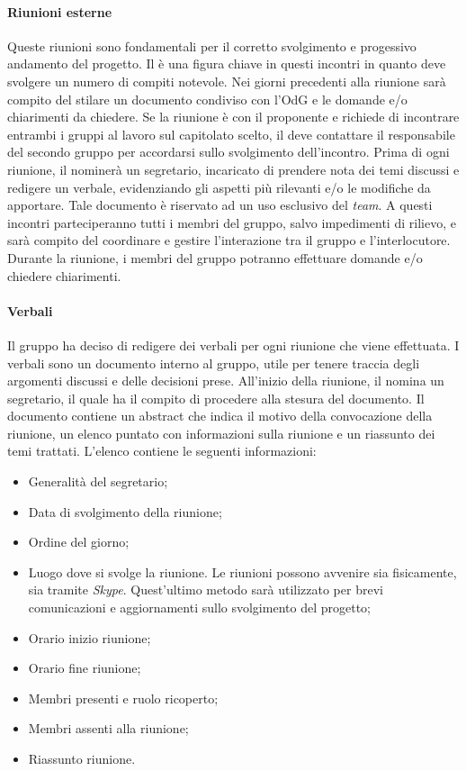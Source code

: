 			\paragraph{Riunioni esterne}
			Queste riunioni sono fondamentali per il corretto svolgimento e progessivo andamento del progetto.
			Il \textit{\RdP} è una figura chiave in questi incontri in quanto deve svolgere un numero di compiti notevole.
			Nei giorni precedenti alla riunione sarà compito del \textit{\RdP} stilare un documento condiviso con l'OdG e le domande e/o chiarimenti da chiedere. Se la riunione è con il proponente e richiede di incontrare entrambi i gruppi al lavoro sul capitolato scelto, il \textit{\RdP} deve contattare il responsabile del secondo gruppo per accordarsi sullo svolgimento dell'incontro. Prima di ogni riunione, il \textit{\RdP} nominerà un segretario, incaricato di prendere nota dei temi discussi e redigere un verbale, evidenziando gli aspetti più rilevanti e/o le modifiche da apportare. Tale documento è riservato ad un uso esclusivo del \textit{team}.
			A questi incontri parteciperanno tutti i membri del gruppo, salvo impedimenti di rilievo, e sarà compito del \textit{\RdP} coordinare e gestire l'interazione tra il gruppo e l'interlocutore. Durante la riunione, i membri del gruppo potranno effettuare domande e/o chiedere chiarimenti. 
			
			\paragraph{Verbali}
			Il gruppo ha deciso di redigere dei verbali per ogni riunione che viene effettuata. I verbali sono un documento interno al gruppo, utile per tenere traccia degli argomenti discussi e delle decisioni prese. All'inizio della riunione, il \textit{\RdP} nomina un segretario, il quale ha il compito di procedere alla stesura del documento. Il documento contiene un abstract che indica il motivo della convocazione della riunione, un elenco puntato con informazioni sulla riunione e un riassunto dei temi trattati. L'elenco contiene le seguenti informazioni:
			\begin{itemize}
				\item Generalità del segretario;
				\item Data di svolgimento della riunione;
				\item Ordine del giorno;
				\item Luogo dove si svolge la riunione. Le riunioni possono avvenire sia fisicamente, sia tramite \textit{Skype}. Quest'ultimo metodo sarà utilizzato per brevi comunicazioni e aggiornamenti sullo svolgimento del progetto;
				\item Orario inizio riunione;
				\item Orario fine riunione;
				\item Membri presenti e ruolo ricoperto;
				\item Membri assenti alla riunione;
				\item Riassunto riunione.
			\end{itemize}

